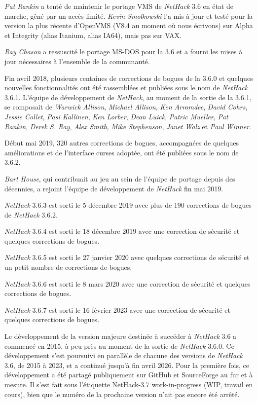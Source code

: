 \documentclass[titlepage]{article}
\begin{document}
\medskip
\textit{Pat Rankin} a tenté de maintenir le portage VMS de \textit{NetHack} 3.6 en état de marche,
gêné par un accès limité.  \textit{Kevin Smolkowski} l'a mis à jour et testé
pour la version la plus récente d'OpenVMS (V8.4 au moment où nous écrivons) sur Alpha
et Integrity (alias Itanium, alias IA64), mais pas sur VAX.

\medskip
\textit{Ray Chason}  a ressuscité le portage MS-DOS pour la 3.6 et a fourni les
mises à jour nécessaires à l'ensemble de la communauté.

\medskip
Fin avril 2018, plusieurs centaines de corrections de bogues de la 3.6.0 et quelques nouvelles fonctionnalités
ont été rassemblées et publiées sous le nom de \textit{NetHack} 3.6.1.
L'équipe de développement de \textit{NetHack}, au
moment de la sortie de la 3.6.1, se composait de
\textit{Warwick Allison}, \textit{Michael Allison}, \textit{Ken Arromdee},
\textit{David Cohrs}, \textit{Jessie Collet},
\textit{Pasi Kallinen}, \textit{Ken Lorber}, \textit{Dean Luick},
\textit{Patric Mueller}, \textit{Pat Rankin}, \textit{Derek S. Ray},
\textit{Alex Smith}, \textit{Mike Stephenson}, \textit{Janet Walz} et
\textit{Paul Winner}.

\medskip
Début mai 2019, 320 autres corrections de bogues, accompagnées de quelques améliorations et
de l'interface curses adoptée, ont été publiées sous le nom de 3.6.2.

\medskip
\textit{Bart House}, qui contribuait au jeu au sein de l'équipe de portage
depuis des décennies, a rejoint l'équipe de développement de \textit{NetHack} fin mai 2019.

\medskip
\textit{NetHack} 3.6.3 est sorti le 5 décembre 2019 avec plus de 190 corrections
de bogues de \textit{NetHack} 3.6.2.

\medskip
\textit{NetHack} 3.6.4 est sorti le 18 décembre 2019 avec une correction de sécurité et
quelques corrections de bogues.

\medskip
\textit{NetHack} 3.6.5 est sorti le 27 janvier 2020 avec quelques corrections de sécurité
et un petit nombre de corrections de bogues.

\medskip
\textit{NetHack} 3.6.6 est sorti le 8 mars 2020 avec une correction de sécurité et
quelques corrections de bogues.

\medskip
\textit{NetHack} 3.6.7 est sorti le 16 février 2023 avec une correction de sécurité et
quelques corrections de bogues.

\medskip
Le développement de la version majeure destinée à succéder à \textit{NetHack} 3.6 a commencé en 2015,
à peu près au moment de la sortie de \textit{NetHack} 3.6.0. Ce développement
s'est poursuivi en parallèle de chacune des versions de \textit{NetHack} 3.6, de 2015
à 2023, et a continué jusqu'à fin avril 2026.  Pour la première fois,
ce développement a été partagé publiquement sur GitHub et SourceForge au fur et à mesure.
Il s'est fait sous l'étiquette NetHack-3.7 work-in-progress (WIP, travail en cours), bien que
le numéro de la prochaine version n'ait pas encore été arrêté.
\end{document}
